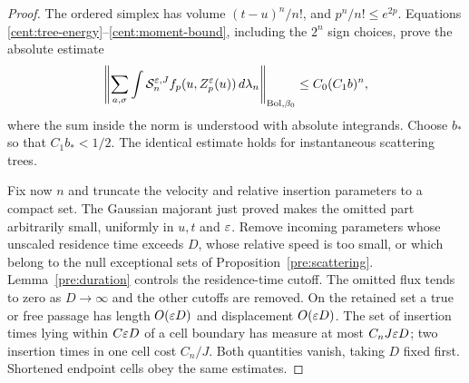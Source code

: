 \begin{proof}
The ordered simplex has volume $(t-u)^n/n!$, and
$p^n/n!\leq e^{2p}$. Equations
\eqref{cent:tree-energy}--\eqref{cent:moment-bound}, including the
$2^n$ sign choices, prove the absolute estimate
\begin{equation}\label{cent:geometric-tail}
 \left\|\sum_{a,\sigma}\int
       \mathcal S_n^{\varepsilon,J}
       f_p(u,Z_p^\varepsilon(u))\,d\lambda_n\right\|_{\mathrm{Bol},\beta_0}
 \leq C_0(C_1b)^n,
\end{equation}
where the sum inside the norm is understood with absolute integrands.
Choose $b_*$ so that $C_1b_*<1/2$. The identical estimate holds for
instantaneous scattering trees.

Fix now $n$ and truncate the velocity and relative insertion parameters
to a compact set. The Gaussian majorant just proved makes the omitted
part arbitrarily small, uniformly in $u,t$ and $\varepsilon$. Remove incoming
parameters whose unscaled residence time exceeds $D$, whose relative
speed is too small, or which belong to the null exceptional sets of
Proposition~\ref{pre:scattering}. Lemma~\ref{pre:duration} controls the
residence-time cutoff. The omitted flux tends to zero as
$D\to\infty$ and the other cutoffs are removed. On the retained set a
true or free passage has length $O(\varepsilon D)$ and displacement
$O(\varepsilon D)$. The set of insertion times lying within $C\varepsilon D$ of a
cell boundary has measure at most $C_nJ\varepsilon D$; two insertion times
in one cell cost $C_n/J$. Both quantities vanish, taking $D$ fixed
first. Shortened endpoint cells obey the same estimates.


\end{proof}
